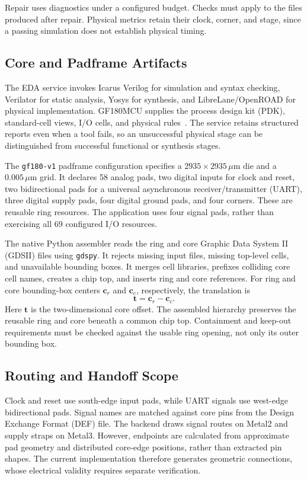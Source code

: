 \documentclass[conference,letterpaper]{IEEEtran}
\begin{document}
Repair uses diagnostics under a configured budget. Checks must apply to the files produced after repair. Physical metrics retain their clock, corner, and stage, since a passing simulation does not establish physical timing.


\subsection{Core and Padframe Artifacts}
The EDA service invokes Icarus Verilog for simulation and syntax checking, Verilator for static analysis, Yosys for synthesis, and LibreLane/OpenROAD for physical implementation. GF180MCU supplies the process design kit (PDK), standard-cell views, I/O cells, and physical rules~\cite{gf180}. The service retains structured reports even when a tool fails, so an unsuccessful physical stage can be distinguished from successful functional or synthesis stages.

The \texttt{gf180-v1} padframe configuration specifies a $2935\times2935\,\mu$m die and a $0.005\,\mu$m grid. It declares 58 analog pads, two digital inputs for clock and reset, two bidirectional pads for a universal asynchronous receiver/transmitter (UART), three digital supply pads, four digital ground pads, and four corners. These are reusable ring resources. The application uses four signal pads, rather than exercising all 69 configured I/O resources.

The native Python assembler reads the ring and core Graphic Data System II (GDSII) files using \texttt{gdspy}. It rejects missing input files, missing top-level cells, and unavailable bounding boxes. It merges cell libraries, prefixes colliding core cell names, creates a chip top, and inserts ring and core references. For ring and core bounding-box centers $\mathbf{c}_r$ and $\mathbf{c}_c$, respectively, the translation is
\begin{equation}
\mathbf{t}=\mathbf{c}_r-\mathbf{c}_c .
\label{eq:translation}
\end{equation}
Here $\mathbf{t}$ is the two-dimensional core offset. The assembled hierarchy preserves the reusable ring and core beneath a common chip top. Containment and keep-out requirements must be checked against the usable ring opening, not only its outer bounding box.

\subsection{Routing and Handoff Scope}
Clock and reset use south-edge input pads, while UART signals use west-edge bidirectional pads. Signal names are matched against core pins from the Design Exchange Format (DEF) file. The backend draws signal routes on Metal2 and supply straps on Metal3. However, endpoints are calculated from approximate pad geometry and distributed core-edge positions, rather than extracted pin shapes. The current implementation therefore generates geometric connections, whose electrical validity requires separate verification.
\end{document}
